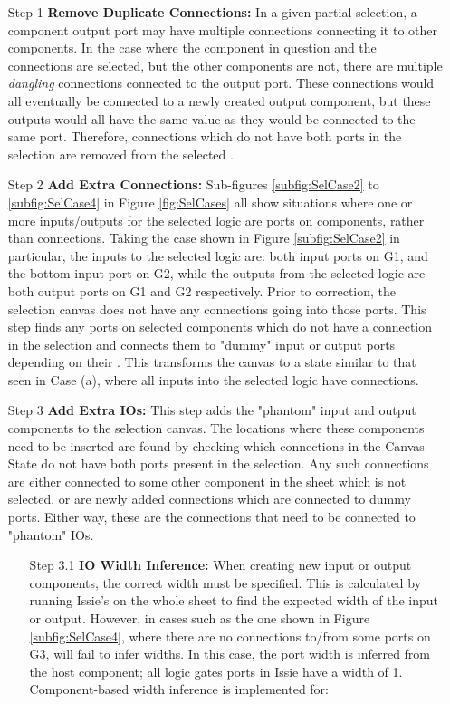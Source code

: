 \begin{itemize}
    \item[Step 1] \textbf{Remove Duplicate Connections:} In a given partial selection, a component output port may have multiple connections connecting it to other components. In the case where the component in question and the connections are selected, but the other components are not, there are multiple \textit{dangling} connections connected to the output port. These connections would all eventually be connected to a newly created output component, but these outputs would all have the same value as they would be connected to the same port. Therefore, connections which do not have both ports in the selection are removed from the selected .
    \item[Step 2] \textbf{Add Extra Connections:} Sub-figures \ref{subfig:SelCase2} to \ref{subfig:SelCase4} in Figure \ref{fig:SelCases} all show situations where one or more inputs/outputs for the selected logic are ports on components, rather than connections. Taking the case shown in Figure \ref{subfig:SelCase2} in particular, the inputs to the selected logic are: both input ports on G1, and the bottom input port on G2, while the outputs from the selected logic are both output ports on G1 and G2 respectively. Prior to correction, the selection canvas does not have any connections going into those ports. This step finds any ports on selected components which do not have a connection in the selection and connects them to "dummy" input or output ports depending on their . This transforms the canvas to a state similar to that seen in Case (a), where   all inputs into the selected logic have connections.
    \item[Step 3] \textbf{Add Extra IOs:} This step adds the "phantom" input and output components to the selection canvas. The locations where these components need to be inserted are found by checking which connections in the Canvas State do not have both ports present in the selection. Any such connections are either connected to some other component in the sheet which is not selected, or are newly added connections which are connected to dummy ports. Either way, these are the connections that need to be connected to "phantom" IOs. 
    \begin{itemize}
        \item[Step 3.1] \textbf{IO Width Inference:} When creating new input or output components, the correct width must be specified. This is         calculated by running Issie's  on the whole sheet to find the expected width of the input or output. However, in cases such as the one shown in Figure \ref{subfig:SelCase4}, where there are no connections to/from some ports on G3,  will fail to infer widths. In this case, the port width is inferred from the host component; all logic gates ports in Issie have a width of 1. Component-based width inference is implemented for:

\end{itemize}
\end{itemize}
